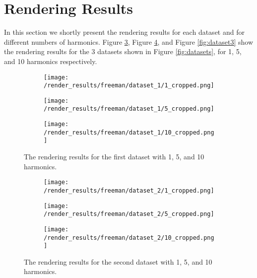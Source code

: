 \documentclass[thesis.tex]{subfiles}
\begin{document}
\section{Rendering Results}

In this section we shortly present the rendering results for each dataset and for different numbers of harmonics. Figure \ref{fig:dataset1}, Figure \ref{fig:dataset2}, and Figure \ref{fig:dataset3} show the rendering results for the 3 datasets shown in Figure \ref{fig:datasets}, for 1, 5, and 10 harmonics respectively.
\begin{figure}[!htb]
\centering
\begin{subfigure}{0.30\textwidth}
		\texttt{[image: /render\_results/freeman/dataset\_1/1\_cropped.png]}
	\caption{}		
\label{fig:dataset1_a}
	\end{subfigure}
\begin{subfigure}{0.30\textwidth}
		\texttt{[image: /render\_results/freeman/dataset\_1/5\_cropped.png]}
	\caption{}		
	\end{subfigure}
\begin{subfigure}{0.30\textwidth}
		\texttt{[image: /render\_results/freeman/dataset\_1/10\_cropped.png]}
	\caption{}		
\label{fig:dataset1_c}
	\end{subfigure}
\caption{The rendering results for the first dataset with 1, 5, and 10 harmonics.}
\label{fig:dataset1}
\end{figure}
\begin{figure}[!htb]
\centering
\begin{subfigure}{0.30\textwidth}
		\texttt{[image: /render\_results/freeman/dataset\_2/1\_cropped.png]}
	\caption{}		
	\end{subfigure}
\begin{subfigure}{0.30\textwidth}
		\texttt{[image: /render\_results/freeman/dataset\_2/5\_cropped.png]}
	\caption{}		
	\end{subfigure}
\begin{subfigure}{0.30\textwidth}
		\texttt{[image: /render\_results/freeman/dataset\_2/10\_cropped.png]}
	\caption{}		
	\end{subfigure}
\caption{The rendering results for the second dataset with 1, 5, and 10 harmonics.}
\label{fig:dataset2}
\end{figure}
\end{document}
